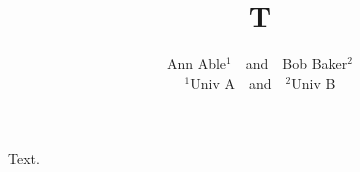 \documentclass{article}
\title{T}
\author{Ann Able$^1$~~and~~Bob Baker$^2$ \\ $^1$Univ A~~and~~$^2$Univ B}
\begin{document}
\maketitle
Text.
\end{document}
